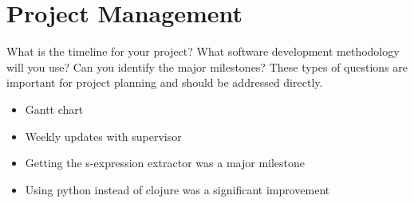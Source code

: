 
\chapter{Project Management}

What is the timeline for your project? What software development
methodology will you use? Can you identify the major milestones? These types of questions are
important for project planning and should be addressed directly.

\begin{itemize}
\item Gantt chart 
\item Weekly updates with supervisor 
\item Getting the s-expression extractor was a major milestone 
\item Using python instead of clojure was a significant improvement
\end{itemize}
